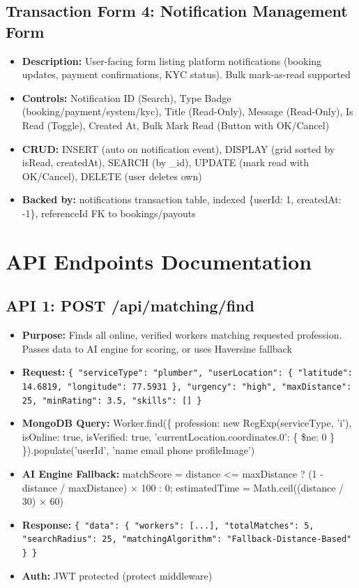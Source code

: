 \documentclass[12pt,a4paper]{article}
\begin{document}
\subsection*{Transaction Form 4: Notification Management Form}
\begin{itemize}[leftmargin=*]
    \item \textbf{Description:} User-facing form listing platform notifications (booking updates, payment confirmations, KYC status). Bulk mark-as-read supported
    \item \textbf{Controls:} Notification ID (Search), Type Badge (booking/payment/system/kyc), Title (Read-Only), Message (Read-Only), Is Read (Toggle), Created At, Bulk Mark Read (Button with OK/Cancel)
    \item \textbf{CRUD:} INSERT (auto on notification event), DISPLAY (grid sorted by isRead, createdAt), SEARCH (by \_id), UPDATE (mark read with OK/Cancel), DELETE (user deletes own)
    \item \textbf{Backed by:} notifications transaction table, indexed \{userId: 1, createdAt: -1\}, referenceId FK to bookings/payouts
\end{itemize}

\section*{API Endpoints Documentation}

\subsection*{API 1: POST /api/matching/find}
\begin{itemize}[leftmargin=*]
    \item \textbf{Purpose:} Finds all online, verified workers matching requested profession. Passes data to AI engine for scoring, or uses Haversine fallback
    \item \textbf{Request:} \texttt{\{ "serviceType": "plumber", "userLocation": \{ "latitude": 14.6819, "longitude": 77.5931 \}, "urgency": "high", "maxDistance": 25, "minRating": 3.5, "skills": [] \}}
    \item \textbf{MongoDB Query:} Worker.find(\{ profession: new RegExp(serviceType, 'i'), isOnline: true, isVerified: true, 'currentLocation.coordinates.0': \{ \$ne: 0 \} \}).populate('userId', 'name email phone profileImage')
    \item \textbf{AI Engine Fallback:} matchScore = distance <= maxDistance ? (1 - distance / maxDistance) × 100 : 0; estimatedTime = Math.ceil((distance / 30) × 60)
    \item \textbf{Response:} \texttt{\{ "data": \{ "workers": [...], "totalMatches": 5, "searchRadius": 25, "matchingAlgorithm": "Fallback-Distance-Based" \} \}}
    \item \textbf{Auth:} JWT protected (protect middleware)
\end{itemize}
\end{document}
